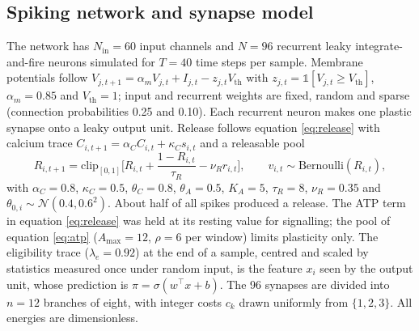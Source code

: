 \subsection*{Spiking network and synapse model}
The network has $N_{\mathrm{in}}=60$ input channels and $N=96$ recurrent leaky integrate-and-fire neurons simulated for $T=40$ time steps per sample. Membrane potentials follow $V_{j,t+1}=\alpha_{m}V_{j,t}+I_{j,t}-z_{j,t}V_{\mathrm{th}}$ with $z_{j,t}=\mathbb{1}[V_{j,t}\ge V_{\mathrm{th}}]$, $\alpha_{m}=0.85$ and $V_{\mathrm{th}}=1$; input and recurrent weights are fixed, random and sparse (connection probabilities 0.25 and 0.10). Each recurrent neuron makes one plastic synapse onto a leaky output unit. Release follows equation \eqref{eq:release} with calcium trace $C_{i,t+1}=\alpha_{C}C_{i,t}+\kappa_{C}s_{i,t}$ and a releasable pool
\begin{equation}
R_{i,t+1}=\mathrm{clip}_{[0,1]}\!\Big[R_{i,t}+\frac{1-R_{i,t}}{\tau_{R}}-\nu_{R}r_{i,t}\Big],\qquad v_{i,t}\sim\mathrm{Bernoulli}(R_{i,t}),
\label{eq:vesicle}
\end{equation}
with $\alpha_{C}=0.8$, $\kappa_{C}=0.5$, $\theta_{C}=0.8$, $\theta_{A}=0.5$, $K_{A}=5$, $\tau_{R}=8$, $\nu_{R}=0.35$ and $\theta_{0,i}\sim\mathcal N(0.4,0.6^{2})$. About half of all spikes produced a release. The ATP term in equation \eqref{eq:release} was held at its resting value for signalling; the pool of equation \eqref{eq:atp} ($A_{\max}=12$, $\rho=6$ per window) limits plasticity only. The eligibility trace ($\lambda_{e}=0.92$) at the end of a sample, centred and scaled by statistics measured once under random input, is the feature $x_{i}$ seen by the output unit, whose prediction is $\pi=\sigma(w^{\top}x+b)$. The 96 synapses are divided into $n=12$ branches of eight, with integer costs $c_{k}$ drawn uniformly from $\{1,2,3\}$. All energies are dimensionless.


